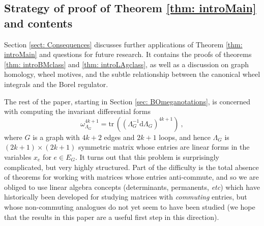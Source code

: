 \documentclass[10pt]{amsart}
\newcommand{\dd}{\mathrm{d}}
\newcommand{\tr}{\mathrm{tr}\,}
\theoremstyle{plain}
\newcommand{\0}{\color{blue}{\mathsf{0}}}
\begin{document}
\subsection{Strategy of proof of Theorem  \ref{thm: introMain} and contents}  Section \ref{sect: Consequences} discusses further applications of Theorem \ref{thm: introMain}
and questions for future research. It  contains the proofs of theorems \ref{thm: introBMclass}  and \ref{thm: introLAgclass},  as well as a discussion on graph homology, wheel motives, and the subtle relationship between the canonical wheel integrals and the Borel regulator. 




The rest of the paper, starting in Section \ref{sec: BOmeganotations}, is concerned with  computing  the invariant differential forms
\[  \omega_{\Lambda_G}^{4k+1} = \tr \left( (\Lambda_G^{-1} \dd \Lambda_G)^{4k+1} \right)\ ,\]
where $G$ is a graph with $4k+2$ edges and $2k+1$ loops, and hence $\Lambda_G$ is $(2k+1)\times (2k+1)$ symmetric matrix whose entries are linear forms in  the variables $x_e$ for $e\in E_G$. 
It turns out that this problem is surprisingly complicated, but very highly structured. Part of the difficulty is the total absence of theorems for working with matrices whose entries  anti-commute, and so we are obliged to use  linear algebra concepts (determinants, permanents, \emph{etc}) which have historically been developed for studying matrices with \emph{commuting} entries, but whose non-commuting analogues do not yet seem to have been studied (we hope that the results in this paper are a useful first step  in this direction). 
\end{document}
